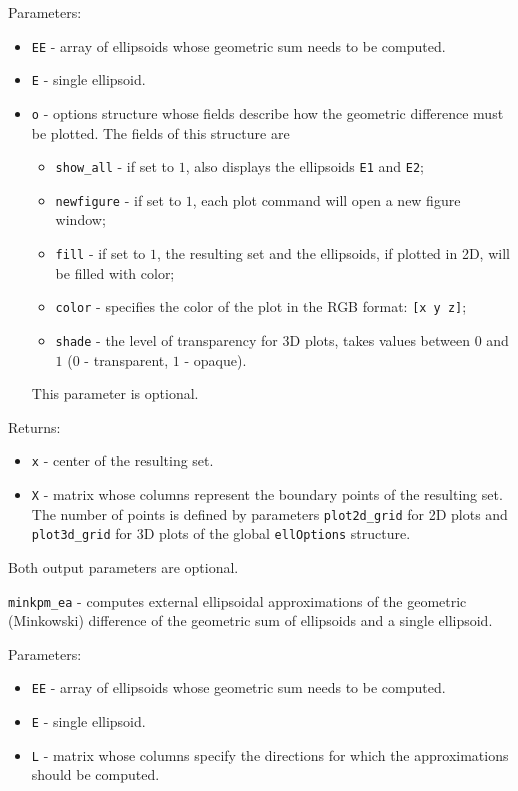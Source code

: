 Parameters:
\begin{itemize}
\item {\tt EE} - array of ellipsoids whose geometric sum needs to be computed.
\item {\tt E} - single ellipsoid.
\item {\tt o} - options structure whose fields describe how the geometric
difference must be plotted. The fields of this structure are
\begin{itemize}
\item {\tt show\_all} - if set to $1$, also displays the ellipsoids
{\tt E1} and {\tt E2};
\item {\tt newfigure} - if set to $1$, each plot command will open a new
figure window;
\item {\tt fill} - if set to $1$, the resulting set and the ellipsoids,
if plotted in 2D, will be filled with color;
\item {\tt color} - specifies the color of the plot in the RGB format:
{\tt [x y z]};
\item {\tt shade} - the level of transparency for 3D plots, takes values
between $0$ and $1$ ($0$ - transparent, $1$ - opaque).
\end{itemize}
This parameter is optional.
\end{itemize}

Returns:
\begin{itemize}
\item {\tt x} - center of the resulting set.
\item {\tt X} - matrix whose columns represent the boundary points of the
resulting set. The number of points is defined by parameters
{\tt plot2d\_grid} for 2D plots and {\tt plot3d\_grid} for 3D plots of the
global {\tt ellOptions} structure.
\end{itemize}
Both output parameters are optional.

\newpage

{\Large {\tt minkpm\_ea}} - computes external ellipsoidal approximations
of the geometric (Minkowski) difference of the geometric sum of ellipsoids
and a single ellipsoid.

Parameters:
\begin{itemize}
\item {\tt EE} - array of ellipsoids whose geometric sum needs to be computed.
\item {\tt E} - single ellipsoid.
\item {\tt L} - matrix whose columns specify the directions for which
the approximations should be computed.
\end{itemize}

